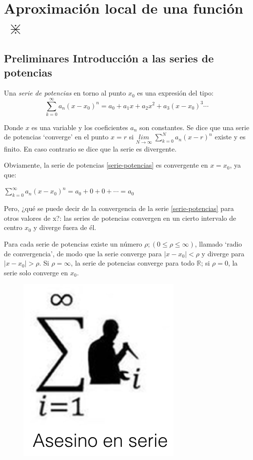 \chapter{Aproximación local de una función $\; \divideontimes$ }	
\section{Preliminares Introducción a las series de potencias}

Una \emph{serie de potencias} en torno al punto $x_0$ es una expresión del tipo:
\begin{equation}
	\label{serie-potencias}
	\sum _{ k=0 }^{ \infty }{a_n(x-x_0)^n}=a_0+a_1x+a_2x^2+a_3(x-x_0)^3\cdots 
\end{equation}

Donde $x$ es una variable y los coeficientes $a_n$ son constantes. Se dice que una serie de potencias `converge' en el punto $x=r$  si $\underset{N\to \infty}{lim }\;{\sum _{ k=0 }^{ N }{a_n(x-r)^n}}$ existe y es finito. En caso contrario se dice que la serie es divergente.

Obviamente, la serie de potencias \ref{serie-potencias} es convergente en $x=x_0$, ya que: 

$\sum _{ k=0 }^{ \infty }{a_n(x-x_0)^n}=a_0+0+0+\cdots =a_0$

	\begin{multicols}{2}
	Pero, ¿qué se puede decir de la convergencia de la serie \ref{serie-potencias} para otros valores de x?: las series de potencias convergen en un cierto intervalo de centro $x_0$ y diverge fuera de él. 

	Para cada serie de potencias existe un número $\rho; (0\le \rho \le \infty)$, llamado `radio de convergencia', de modo que la serie converge para $|x-x_0|<\rho$ y diverge para $|x-x_0|>\rho$. Si $\rho=\infty$, la serie de potencias converge para todo $\mathbb R$; si $\rho=0$, la serie solo converge en $x_0$.

	\begin{figure}[H]
		\centering
		\includegraphics[width=0.25
	\textwidth]{imagenes/imagenes06/xiste06.png}
	\end{figure}
	\end{multicols}

